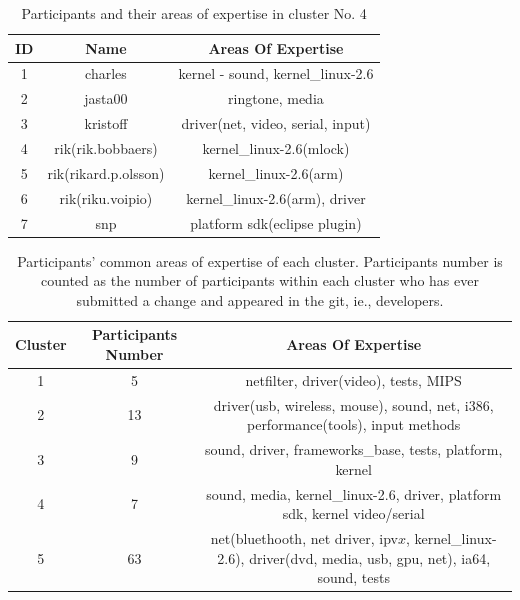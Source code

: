 \documentclass[conference]{IEEEtran}
\begin{document}
\begin{table}[!t]
\renewcommand{\arraystretch}{1.3}
\caption{Participants and their areas of expertise in cluster No. 4}
\label{cluster_no4}
\centering
\begin{tabular}{|c|c|c|}
\hline
ID & Name & Areas Of Expertise \\
\hline
1 & charles & kernel - sound, kernel\_linux-2.6 \\
\hline
2 & jasta00 & ringtone, media \\
\hline
3 & kristoff & driver(net, video, serial, input) \\
\hline
4 & rik(rik.bobbaers) & kernel\_linux-2.6(mlock) \\
\hline
5 & rik(rikard.p.olsson) & kernel\_linux-2.6(arm) \\
\hline
6 & rik(riku.voipio) & kernel\_linux-2.6(arm), driver \\
\hline
7 & snp & platform sdk(eclipse plugin) \\
\hline
\end{tabular}
\end{table}

\begin{table}[!t]
\caption{Participants' common areas of expertise of each cluster. Participants number is counted as the number of participants within each cluster who has ever submitted a change and appeared in the git, ie., developers.}
\label{cluster_topic}
\centering
\begin{tabular}{|c|c|c|}
\hline
Cluster & Participants Number & Areas Of Expertise \\
\hline
1 & 5 & netfilter, driver(video), tests, MIPS \\
\hline
2 & 13 & driver(usb, wireless, mouse), sound, net, i386, performance(tools), input methods \\
\hline
3 & 9 & sound, driver, frameworks\_base, tests, platform, kernel \\
\hline
4 & 7 & sound, media, kernel\_linux-2.6, driver, platform sdk, kernel video/serial \\
\hline
5 & 63 & net(bluethooth, net driver, ipv$x$, kernel\_linux-2.6), driver(dvd, media, usb, gpu, net), ia64, sound, tests \\
\hline
\end{tabular}
\end{table}
\end{document}
